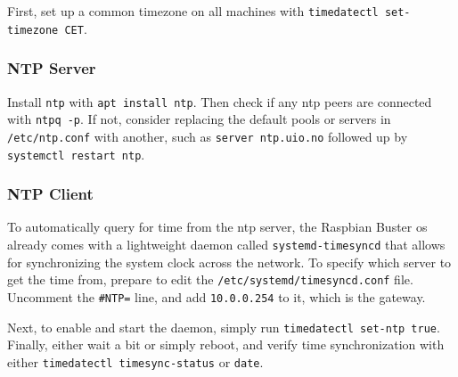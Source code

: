 First, set up a common timezone on all machines with \lstinline{timedatectl set-timezone CET}.

\subsubsection{NTP Server}

Install \lstinline{ntp} with \lstinline{apt install ntp}. Then check if any \gls{ntp} peers are connected with \lstinline{ntpq -p}. If not, consider replacing the default pools or servers in \lstinline{/etc/ntp.conf} with another, such as \lstinline{server ntp.uio.no} followed up by \lstinline{systemctl restart ntp}.

\subsubsection{NTP Client}

To automatically query for time from the \gls{ntp} server, the Raspbian Buster \gls{os} already comes with a lightweight daemon called \lstinline{systemd-timesyncd} that allows for synchronizing the system clock across the network. To specify which server to get the time from, prepare to edit the \lstinline{/etc/systemd/timesyncd.conf} file. Uncomment the \lstinline{#NTP=} line, and add \lstinline{10.0.0.254} to it, which is the gateway.

Next, to enable and start the daemon, simply run \lstinline{timedatectl set-ntp true}. Finally, either wait a bit or simply reboot, and verify time synchronization with either \lstinline{timedatectl timesync-status} or \lstinline{date}.





